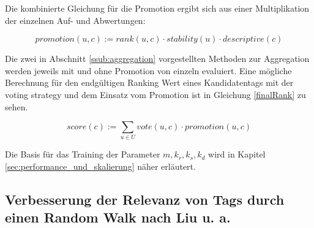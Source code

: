 Die kombinierte Gleichung für die Promotion ergibt sich aus einer Multiplikation der einzelnen Auf- und Abwertungen:
\begin{figure}[!hptb]
 \begin{equation}
 \label{combinedPromotion}
    promotion(u, c) := rank(u, c) \cdot stability(u) \cdot descriptive(c)
 \end{equation}
\end{figure}


Die zwei in Abschnitt \ref{ssub:aggregation} vorgestellten Methoden zur Aggregation werden jeweils mit und ohne Promotion von \cite{collectiveKnowledge} einzeln evaluiert. Eine mögliche Berechnung für den endgültigen Ranking Wert eines Kandidatentags mit der voting strategy und dem Einsatz vom Promotion ist in Gleichung \ref{finalRank} zu sehen.

\begin{figure}[!hptb]
 \begin{equation}
 \label{finalRank}
    score(c) :=  \sum_{u \in U} vote(u, c) \cdot promotion(u, c)
 \end{equation}
\end{figure}


Die Basis für das Training der Parameter $m,	k_r,	k_s, k_d$ wird in Kapitel \ref{sec:performance_und_skalierung} näher erläutert. 


\subsection{Verbesserung der Relevanz von Tags durch einen Random Walk nach Liu u. a.} %
\label{sub:verbesserung_der_relevanz_durch_einen_random_walk}

% 
% 
% 
% 

